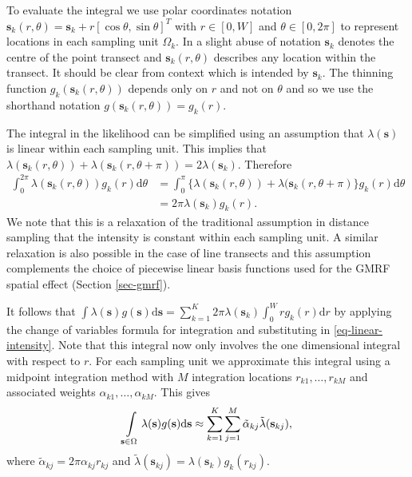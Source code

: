 \documentclass{stylefile16/statsoc}
\newcommand{\bs}{\mathbf{s}}
\newcommand{\tl}{\tilde{\lambda}}   %
\begin{document}
To evaluate the integral we use polar coordinates notation $\bs_k(r, \theta) = \bs_k + r\left[\cos\theta, \sin\theta \right]^T$ with $r \in [0, W]$ and $\theta \in [0, 2\pi]$ to represent locations in each sampling unit $\Omega_k$.  In a slight abuse of notation $\bs_k$ denotes the centre of the point transect and $\bs_k(r,\theta)$ describes any location within the transect.  It should be clear from context which is intended by $\bs_k$.   The thinning function $g_k(\bs_k(r, \theta))$ depends only on $r$ and not on $\theta$ and so we use the shorthand notation $ g(\bs_k(r, \theta)) = g_k(r)$. 

The integral in the likelihood can be simplified using an assumption that $\lambda(\bs)$ is linear within each sampling unit.  This implies that $\lambda(\bs_k(r, \theta)) + \lambda(\bs_k(r, \theta + \pi)) = 2\lambda(\bs_k)$.  Therefore
\begin{align}
\label{eq-linear-intensity}
	\int_0^{2\pi} \lambda(\bs_k(r, \theta))g_k(r)\mathrm{d}\theta &= \int_0^\pi \{\lambda(\bs_k(r, \theta)) + \lambda(\bs_k(r, \theta + \pi) \} g_k(r)\mathrm{d}\theta \nonumber \\
	&= 2\pi \lambda(\bs_k)g_k(r).
\end{align}
We note that this is a relaxation of the traditional assumption in distance sampling that the intensity is constant within each sampling unit.  A similar relaxation is also possible in the case of line transects \citep{yuan_point_2017} and this assumption complements the choice of piecewise linear basis functions used for the GMRF spatial effect (Section \ref{sec-gmrf}).  

It follows that $\int \lambda(\bs)g(\bs) \mathrm{d}\bs = \sum_{k=1}^K 2\pi \lambda(\bs_k) \int_0^W r g_k(r)\mathrm{d}r$ by applying the change of variables formula for integration and substituting in \eqref{eq-linear-intensity}.  Note that this integral now only involves the one dimensional integral with respect to $r$.  For each sampling unit we approximate this integral using a midpoint integration method with $M$ integration locations $r_{k1}, \ldots, r_{kM}$ and associated weights $\alpha_{k1}, \ldots, \alpha_{kM}$.  This gives
\begin{equation*}
	\int\displaylimits_{\bs \in \Omega} \lambda(\bs)g(\bs)\mathrm{d}\bs \approx \sum_{k=1}^K \sum_{j=1}^M \tilde{\alpha}_{kj} \tl(\bs_{kj}) ,
\end{equation*}
where $\tilde{\alpha}_{kj} = 2\pi \alpha_{kj}r_{kj}$ and $\tl(\bs_{kj}) = \lambda(\bs_k) g_k(r_{kj})$.
\end{document}
